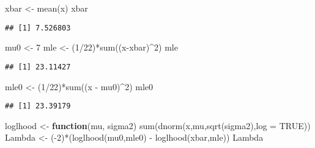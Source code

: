 \documentclass[
]{book}
\newenvironment{Shaded}{\begin{snugshade}}{\end{snugshade}}
\newcommand{\AttributeTok}[1]{\textcolor[rgb]{0.77,0.63,0.00}{#1}}
\newcommand{\ConstantTok}[1]{\textcolor[rgb]{0.00,0.00,0.00}{#1}}
\newcommand{\ControlFlowTok}[1]{\textcolor[rgb]{0.13,0.29,0.53}{\textbf{#1}}}
\newcommand{\DecValTok}[1]{\textcolor[rgb]{0.00,0.00,0.81}{#1}}
\newcommand{\FunctionTok}[1]{\textcolor[rgb]{0.00,0.00,0.00}{#1}}
\newcommand{\NormalTok}[1]{#1}
\newcommand{\OtherTok}[1]{\textcolor[rgb]{0.56,0.35,0.01}{#1}}
\newcommand{\SpecialCharTok}[1]{\textcolor[rgb]{0.00,0.00,0.00}{#1}}
\begin{document}
\begin{Shaded}
\begin{Highlighting}[]
\NormalTok{xbar }\OtherTok{\textless{}{-}} \FunctionTok{mean}\NormalTok{(x)}
\NormalTok{xbar}
\end{Highlighting}
\end{Shaded}

\begin{verbatim}
## [1] 7.526803
\end{verbatim}

\begin{Shaded}
\begin{Highlighting}[]
\NormalTok{mu0 }\OtherTok{\textless{}{-}} \DecValTok{7}
\NormalTok{mle }\OtherTok{\textless{}{-}}\NormalTok{ (}\DecValTok{1}\SpecialCharTok{/}\DecValTok{22}\NormalTok{)}\SpecialCharTok{*}\FunctionTok{sum}\NormalTok{((x}\SpecialCharTok{{-}}\NormalTok{xbar)}\SpecialCharTok{\^{}}\DecValTok{2}\NormalTok{)}
\NormalTok{mle}
\end{Highlighting}
\end{Shaded}

\begin{verbatim}
## [1] 23.11427
\end{verbatim}

\begin{Shaded}
\begin{Highlighting}[]
\NormalTok{mle0 }\OtherTok{\textless{}{-}}\NormalTok{ (}\DecValTok{1}\SpecialCharTok{/}\DecValTok{22}\NormalTok{)}\SpecialCharTok{*}\FunctionTok{sum}\NormalTok{((x }\SpecialCharTok{{-}}\NormalTok{ mu0)}\SpecialCharTok{\^{}}\DecValTok{2}\NormalTok{)}
\NormalTok{mle0}
\end{Highlighting}
\end{Shaded}

\begin{verbatim}
## [1] 23.39179
\end{verbatim}

\begin{Shaded}
\begin{Highlighting}[]
\NormalTok{loglhood }\OtherTok{\textless{}{-}} \ControlFlowTok{function}\NormalTok{(mu, sigma2)  }\FunctionTok{sum}\NormalTok{(}\FunctionTok{dnorm}\NormalTok{(x,mu,}\FunctionTok{sqrt}\NormalTok{(sigma2),}\AttributeTok{log =} \ConstantTok{TRUE}\NormalTok{))}
\NormalTok{Lambda }\OtherTok{\textless{}{-}}\NormalTok{ (}\SpecialCharTok{{-}}\DecValTok{2}\NormalTok{)}\SpecialCharTok{*}\NormalTok{(}\FunctionTok{loglhood}\NormalTok{(mu0,mle0) }\SpecialCharTok{{-}} \FunctionTok{loglhood}\NormalTok{(xbar,mle)) }
\NormalTok{Lambda}
\end{Highlighting}
\end{Shaded}
\end{document}
